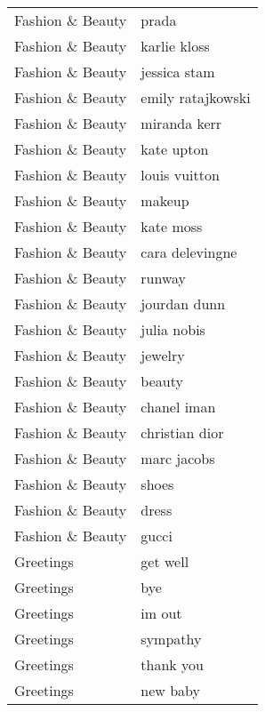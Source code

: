\begin{supertabular}{l p{0.25\textwidth}}
 Fashion \& Beauty &                              prada \\
 Fashion \& Beauty &                       karlie kloss \\
 Fashion \& Beauty &                       jessica stam \\
 Fashion \& Beauty &                  emily ratajkowski \\
 Fashion \& Beauty &                       miranda kerr \\
 Fashion \& Beauty &                         kate upton \\
 Fashion \& Beauty &                      louis vuitton \\
 Fashion \& Beauty &                             makeup \\
 Fashion \& Beauty &                          kate moss \\
 Fashion \& Beauty &                    cara delevingne \\
 Fashion \& Beauty &                             runway \\
 Fashion \& Beauty &                       jourdan dunn \\
 Fashion \& Beauty &                        julia nobis \\
 Fashion \& Beauty &                            jewelry \\
 Fashion \& Beauty &                             beauty \\
 Fashion \& Beauty &                        chanel iman \\
 Fashion \& Beauty &                     christian dior \\
 Fashion \& Beauty &                        marc jacobs \\
 Fashion \& Beauty &                              shoes \\
 Fashion \& Beauty &                              dress \\
 Fashion \& Beauty &                              gucci \\
        Greetings &                           get well \\
        Greetings &                                bye \\
        Greetings &                             im out \\
        Greetings &                           sympathy \\
        Greetings &                          thank you \\
        Greetings &                           new baby \\

\end{supertabular}
